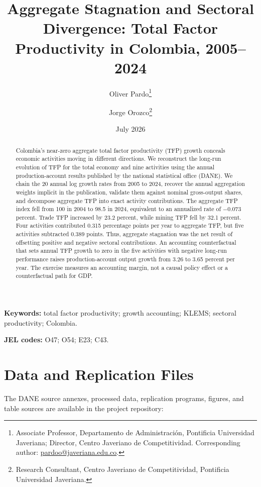 \documentclass[12pt]{article}
\title{Aggregate Stagnation and Sectoral Divergence: Total Factor Productivity in Colombia, 2005--2024}
\author{
Oliver Pardo\thanks{Associate Professor, Departamento de Administraci\'on, Pontificia Universidad Javeriana; Director, Centro Javeriano de Competitividad. Corresponding author: \href{mailto:pardoo@javeriana.edu.co}{pardoo@javeriana.edu.co}.}
\and
Jorge Orozco\thanks{Research Consultant, Centro Javeriano de Competitividad, Pontificia Universidad Javeriana.}
}
\date{July 2026}
\begin{document}
\maketitle

\begin{abstract}
Colombia's near-zero aggregate total factor productivity (TFP) growth conceals economic activities moving in different directions. We reconstruct the long-run evolution of TFP for the total economy and nine activities using the annual production-account results published by the national statistical office (DANE). We chain the 20 annual log growth rates from 2005 to 2024, recover the annual aggregation weights implicit in the publication, validate them against nominal gross-output shares, and decompose aggregate TFP into exact activity contributions. The aggregate TFP index fell from 100 in 2004 to 98.5 in 2024, equivalent to an annualized rate of $-0.073$ percent. Trade TFP increased by 23.2 percent, while mining TFP fell by 32.1 percent. Four activities contributed 0.315 percentage points per year to aggregate TFP, but five activities subtracted 0.389 points. Thus, aggregate stagnation was the net result of offsetting positive and negative sectoral contributions. An accounting counterfactual that sets annual TFP growth to zero in the five activities with negative long-run performance raises production-account output growth from 3.26 to 3.65 percent per year. The exercise measures an accounting margin, not a causal policy effect or a counterfactual path for GDP.
\end{abstract}

\noindent\textbf{Keywords:} total factor productivity; growth accounting; KLEMS; sectoral productivity; Colombia.

\noindent\textbf{JEL codes:} O47; O54; E23; C43.






\clearpage
\appendix


\section*{Data and Replication Files}

The DANE source annexes, processed data, replication programs, figures, and table sources are available in the project repository:
\end{document}

